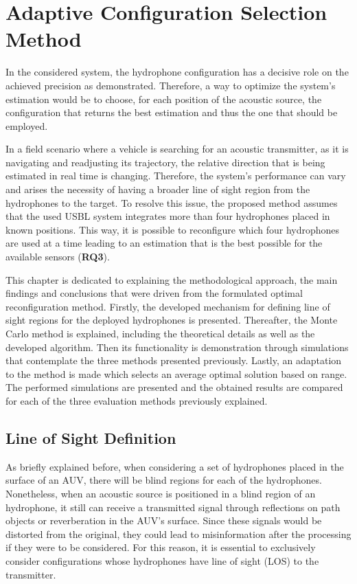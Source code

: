 \chapter{Adaptive Configuration Selection Method}  \label{chap:study}

In the considered system, the hydrophone configuration has a decisive role on the achieved precision as demonstrated. Therefore, a way to optimize the system's estimation would be to choose, for each position of the acoustic source, the configuration that returns the best estimation and thus the one that should be employed.

In a field scenario where a vehicle is searching for an acoustic transmitter, as it is navigating and readjusting its trajectory, the relative direction that is being estimated in real time is changing. Therefore, the system's performance can vary and arises the necessity of having a broader line of sight region from the hydrophones to the target. To resolve this issue, the proposed method assumes that the used USBL system integrates more than four hydrophones placed in known positions. This way, it is possible to reconfigure which four hydrophones are used at a time leading to an estimation that is the best possible for the available sensors (\textbf{RQ3}). 

This chapter is dedicated to explaining the methodological approach, the main findings and conclusions that were driven from the formulated optimal reconfiguration method. Firstly, the developed mechanism for defining line of sight regions for the deployed hydrophones is presented. Thereafter, the Monte Carlo method is explained, including the theoretical details as well as the developed algorithm. Then its functionality is demonstration through simulations that contemplate the three methods presented previously. Lastly, an adaptation to the method is made which selects an average optimal solution based on range. The performed simulations are presented and the obtained results are compared for each of the three evaluation methods previously explained.

\section{Line of Sight Definition} \label{subsec:lineofsight}

As briefly explained before, when considering a set of hydrophones placed in the surface of an AUV, there will be blind regions for each of the hydrophones. Nonetheless, when an acoustic source is positioned in a blind region of an hydrophone, it still can receive a transmitted signal through reflections on path objects or reverberation in the AUV's surface. Since these signals would be distorted from the original, they could lead to misinformation after the processing if they were to be considered. For this reason, it is essential to exclusively consider configurations whose hydrophones have line of sight (LOS) to the transmitter. 

